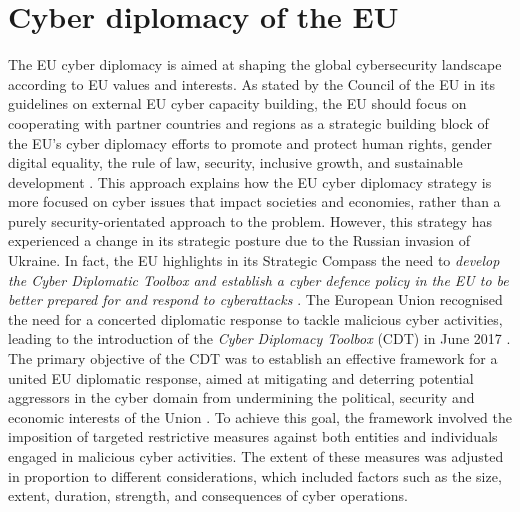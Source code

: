 \section{Cyber diplomacy of the EU}

The EU cyber diplomacy is aimed at shaping the global cybersecurity landscape according to EU values and interests. As stated by the Council of the EU in its guidelines on external EU cyber capacity building, the EU should focus on cooperating with partner countries and regions as a strategic building block of the EU’s cyber diplomacy efforts to promote and protect human rights, gender digital equality, the rule of law, security, inclusive growth, and sustainable development \autocite{counciloftheeuropeanunion_2018_eu}. This approach explains how the EU cyber diplomacy strategy is more focused on cyber issues that impact societies and economies, rather than a purely security-orientated approach to the problem. However, this strategy has experienced a change in its strategic posture due to the Russian invasion of Ukraine. In fact, the EU highlights in its Strategic Compass the need to \textit{develop the Cyber Diplomatic Toolbox and establish a cyber defence policy in the EU to be better prepared for and respond to cyberattacks} \autocite{eeas_2022_a}. The European Union recognised the need for a concerted diplomatic response to tackle malicious cyber activities, leading to the introduction of the \textit{ Cyber Diplomacy Toolbox} (CDT) in June 2017 \autocite{detomascolatin_2020_si}. The primary objective of the CDT was to establish an effective framework for a united EU diplomatic response, aimed at mitigating and deterring potential aggressors in the cyber domain from undermining the political, security and economic interests of the Union \autocite{counciloftheeuropeanunion_2017_council}. To achieve this goal, the framework involved the imposition of targeted restrictive measures against both entities and individuals engaged in malicious cyber activities. The extent of these measures was adjusted in proportion to different considerations, which included factors such as the size, extent, duration, strength, and consequences of cyber operations.


